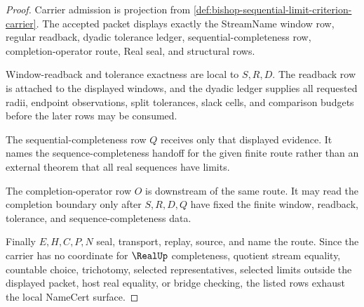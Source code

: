 \begin{proof}
Carrier admission is projection from \autoref{def:bishop-sequential-limit-criterion-carrier}. The accepted packet displays exactly the StreamName window row, regular readback, dyadic tolerance ledger, sequential-completeness row, completion-operator route, Real seal, and structural rows.

Window-readback and tolerance exactness are local to $S,R,D$. The readback row is attached to the displayed windows, and the dyadic ledger supplies all requested radii, endpoint observations, split tolerances, slack cells, and comparison budgets before the later rows may be consumed.

The sequential-completeness row $Q$ receives only that displayed evidence. It names the sequence-completeness handoff for the given finite route rather than an external theorem that all real sequences have limits.

The completion-operator row $O$ is downstream of the same route. It may read the completion boundary only after $S,R,D,Q$ have fixed the finite window, readback, tolerance, and sequence-completeness data.

Finally $E,H,C,P,N$ seal, transport, replay, source, and name the route. Since the carrier has no coordinate for $\RealUp$ completeness, quotient stream equality, countable choice, trichotomy, selected representatives, selected limits outside the displayed packet, host real equality, or bridge checking, the listed rows exhaust the local NameCert surface.
\end{proof}

